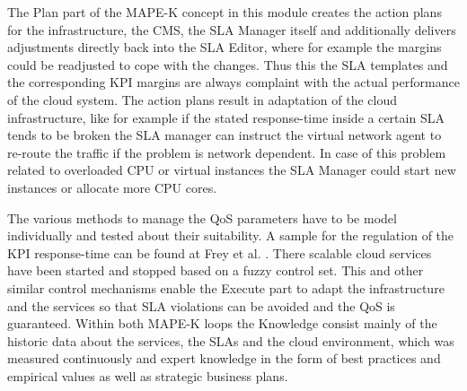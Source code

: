 The Plan part of the MAPE-K concept in this module creates the action plans for the infrastructure, the CMS, the SLA Manager itself and additionally delivers adjustments directly back into the SLA Editor, where for example the margins could be readjusted to cope with the changes. Thus this the SLA templates and the corresponding KPI margins are always complaint with the actual performance of the cloud system. The action plans result in adaptation of the cloud infrastructure, like for example if the stated response-time inside a certain SLA tends to be broken the SLA manager can instruct the virtual network agent to re-route the traffic if the problem is network dependent. In case of this problem related to overloaded CPU or virtual instances the SLA Manager could start new instances or allocate more CPU cores.

The various methods to manage the QoS parameters have to be model individually and tested about their suitability. A sample for the regulation of the KPI response-time can be found at Frey et al.  \cite{Fuzzy}. There scalable cloud services have been started and stopped based on a fuzzy control set. This and other similar control mechanisms enable the Execute part to adapt the infrastructure and the services so that SLA violations can be avoided and the QoS is guaranteed. Within both MAPE-K loops the Knowledge consist mainly of the historic data about the services, the SLAs and the cloud environment, which was measured continuously and expert knowledge in the form of best practices and empirical values as well as strategic business plans. %


